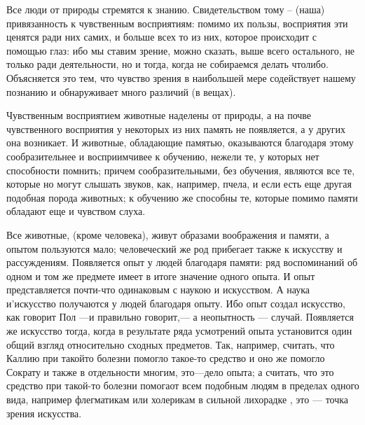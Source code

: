 \documentclass{article}
\begin{document}
Все люди от природы стремятся к знанию. Свидетельством тому -- (наша) привязанность к чувственным восприятиям: помимо их пользы, восприятия эти ценятся ради них самих, и больше всех то из них, которое происходит с помощью глаз: ибо мы ставим зрение, можно сказать, выше всего остального, не только ради деятельности, но и тогда, когда не собираемся делать чтолибо. Объясняется это тем, что чувство зрения в наибольшей мере содействует нашему познанию и обнаруживает много различий (в вещах).

Чувственным восприятием животные наделены от природы, а на почве чувственного восприятия у некоторых из них память не появляется, а у других она возникает. И животные, обладающие памятью, оказываются благодаря этому сообразительнее и восприимчивее к обучению, нежели те, у которых нет способности помнить; причем сообразительными, без обучения, являются все те, которые но могут слышать звуков, как, например, пчела, и если есть еще другая подобная порода животных; к обучению же способны те, которые помимо памяти обладают еще и чувством слуха.

Все животные, (кроме человека), живут образами воображения и памяти, а опытом пользуются мало; человеческий же род прибегает также к искусству и рассуждениям. Появляется опыт у людей благодаря памяти: ряд воспоминаний об одном и том же предмете имеет в итоге значение одного опыта. И опыт представляется почти-что одинаковым с наукою и искусством. А наука и'искусство получаются у людей благодаря опыту. Ибо опыт создал искусство, как говорит Пол —и правильно говорит,— а неопытность — случай. Появляется же искусство тогда, когда в результате ряда усмотрений опыта установится один общий взгляд относительно сходных предметов. Так, например, считать, что Каллию при такойто болезни помогло такое-то средство и оно же помогло Сократу и также в отдельности многим, это—дело опыта; а считать, что это средство при такой-то болезни помогаот всем подобным людям в пределах одного вида, например флегматикам или холерикам в сильной лихорадке
\footnotemark[1]
, это — точка зрения искусства.
\end{document}
